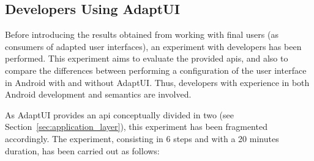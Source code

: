 \subsection{Developers Using AdaptUI}
\label{sec:developers}

Before introducing the results obtained from working with final users (as 
consumers of adapted user interfaces), an experiment with developers has been 
performed. This experiment aims to evaluate the provided \acp{api}, and also to 
compare the differences between performing a configuration of the user interface 
in Android with and without AdaptUI. Thus, developers with experience in both 
Android development and semantics are involved.

As AdaptUI provides an \ac{api} conceptually divided in two (see 
Section~\ref{sec:application_layer}), this experiment has been fragmented 
accordingly. The experiment, consisting in 6 steps and with a 20 minutes duration,
has been carried out as follows:

